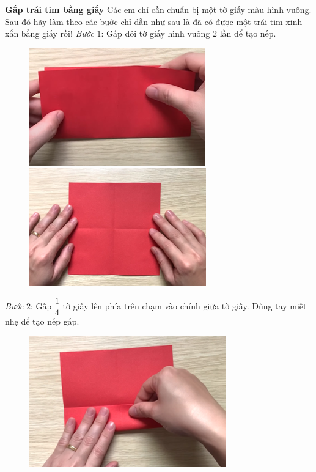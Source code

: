 \begin{multicols}{2}
	\textbf{\color{toancuabi}Gấp trái tim bằng giấy}
	\vskip 0.1cm
	Các em chỉ cần chuẩn bị một tờ giấy màu hình vuông. Sau đó hãy làm theo các bước chỉ dẫn như sau là đã có được một trái tim xinh xắn bằng giấy rồi!
	\vskip 0.1cm
	\textit{Bước} $1$: Gấp đôi tờ giấy hình vuông $2$ lần để tạo nếp. 
	\begin{figure}[H]
		\vspace*{-5pt}
		\centering
		\captionsetup{labelformat= empty, justification=centering}
		\includegraphics[height= 0.327\linewidth]{20}
		\includegraphics[height= 0.327\linewidth]{21}
		\vspace*{-10pt}
	\end{figure}
	\textit{Bước} $2$: Gấp $\dfrac{1}{4}$ tờ giấy lên phía trên chạm vào chính giữa tờ giấy. Dùng tay miết nhẹ để tạo nếp gấp.
	\begin{figure}[H]
		\vspace*{-5pt}
		\centering
		\captionsetup{labelformat= empty, justification=centering}
		\includegraphics[width= 1\linewidth]{22}

\end{figure}
\end{multicols}
